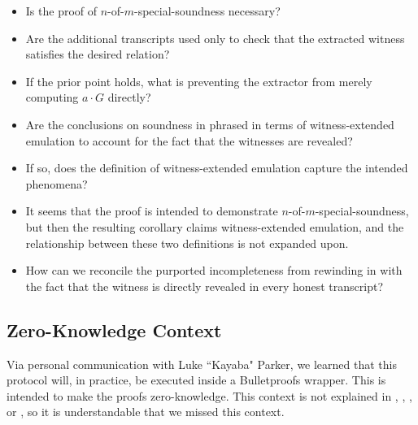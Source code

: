 \documentclass{article}
\theoremstyle{definition}
\newcommand{\6}{\mathbf}
\newcommand{\7}{\mathcal}
\begin{document}
\begin{itemize} 
\item Is the proof of $n$-of-$m$-special-soundness necessary? 
\item Are the additional transcripts used only to check that the extracted witness satisfies the desired relation? 
\item If the prior point holds, what is preventing the extractor from merely computing $a \cdot G$ directly? 
\item Are the conclusions on soundness in \cite{BassaSoundnessIPDL} phrased in terms of witness-extended emulation to account for the fact that the witnesses are revealed? 
\item If so, does the definition of witness-extended emulation capture the intended phenomena?
\item It seems that the proof is intended to demonstrate $n$-of-$m$-special-soundness, but then the resulting corollary claims witness-extended emulation, and the relationship between these two definitions is not expanded upon.
\item How can we reconcile the purported incompleteness from rewinding in \cite{BassaSoundnessIPDL} with the fact that the witness is directly revealed in every honest transcript?
\end{itemize}



\subsection{Zero-Knowledge Context}\label{sec:zk_context}
    
    Via personal communication with Luke ``Kayaba" Parker, we learned that this protocol will, in practice, be executed inside a Bulletproofs \cite{Bullet} wrapper. This is intended to make the proofs zero-knowledge. This context is not explained in \cite{Eagen22}, \cite{BassaLogDerivSoP}, \cite{BassaSoundnessIPDL}, or \cite{BassaSoundnessProofSoP}, so it is understandable that we missed this context. 
    
\end{document}
